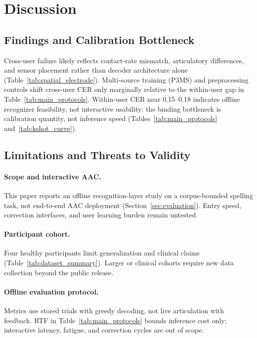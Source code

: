 \section{Discussion}
\label{sec:discussion}

\subsection{Findings and Calibration Bottleneck}

Cross-user failure likely reflects contact-rate mismatch, articulatory differences, and sensor placement rather than decoder architecture alone (Table~\ref{tab:spatial_electrode}).
Multi-source training (P3MS) and preprocessing controls shift cross-user CER only marginally relative to the within-user gap in Table~\ref{tab:main_protocols}.
Within-user CER near 0.15--0.18 indicates offline recognizer feasibility, not interactive usability; the binding bottleneck is calibration quantity, not inference speed (Tables~\ref{tab:main_protocols} and~\ref{tab:kshot_curve}).

\subsection{Limitations and Threats to Validity}

\paragraph{Scope and interactive AAC.}
This paper reports an offline recognition-layer study on a corpus-bounded spelling task, not end-to-end AAC deployment (Section~\ref{sec:evaluation}).
Entry speed, correction interfaces, and user learning burden remain untested.

\paragraph{Participant cohort.}
Four healthy participants limit generalization and clinical claims (Table~\ref{tab:dataset_summary}).
Larger or clinical cohorts require new data collection beyond the public release.

\paragraph{Offline evaluation protocol.}
Metrics use stored trials with greedy decoding, not live articulation with feedback.
RTF in Table~\ref{tab:main_protocols} bounds inference cost only; interactive latency, fatigue, and correction cycles are out of scope.

